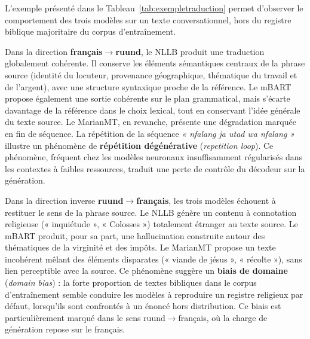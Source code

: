 \begin{landscape}
\begin{longtable}{p{4.5cm}p{4.5cm}p{4.5cm}p{4.5cm}p{4.5cm}}
\bottomrule
\end{longtable}
\addtocounter{table}{-1}
{\captionsetup{hypcap=false}
\label{tab:exempletraduction}}
\endgroup
\end{landscape}


L'exemple présenté dans le Tableau~\ref{tab:exempletraduction} permet d'observer le comportement des trois modèles sur un texte conversationnel, hors du registre biblique majoritaire du corpus d'entraînement.

Dans la direction \textbf{français$\rightarrow$ruund}, le \ac{NLLB} produit une traduction globalement cohérente. Il conserve les éléments sémantiques centraux de la phrase source (identité du locuteur, provenance géographique, thématique du travail et de l'argent), avec une structure syntaxique proche de la référence. Le \ac{mBART} propose également une sortie cohérente sur le plan grammatical, mais s'écarte davantage de la référence dans le choix lexical, tout en conservant l'idée générale du texte source. Le \ac{MarianMT}, en revanche, présente une dégradation marquée en fin de séquence. La répétition de la séquence \textit{« nfalang ja utad wa nfalang »} illustre un phénomène de \textbf{répétition dégénérative} (\textit{repetition loop}). Ce phénomène, fréquent chez les modèles neuronaux insuffisamment régularisés dans les contextes à faibles ressources, traduit une perte de contrôle du décodeur sur la génération.

Dans la direction inverse \textbf{ruund$\rightarrow$français}, les trois modèles échouent à restituer le sens de la phrase source. Le \ac{NLLB} génère un contenu à connotation religieuse (« inquiétude », « Colosses ») totalement étranger au texte source. Le \ac{mBART} produit, pour sa part, une hallucination construite autour des thématiques de la virginité et des impôts. Le \ac{MarianMT} propose un texte incohérent mêlant des éléments disparates (« viande de jésus », « récolte »), sans lien perceptible avec la source. Ce phénomène suggère un \textbf{biais de domaine} (\textit{domain bias}) : la forte proportion de textes bibliques dans le corpus d'entraînement semble conduire les modèles à reproduire un registre religieux par défaut, lorsqu'ils sont confrontés à un énoncé hors distribution. Ce biais est particulièrement marqué dans le sens ruund$\rightarrow$français, où la charge de génération repose sur le français.


